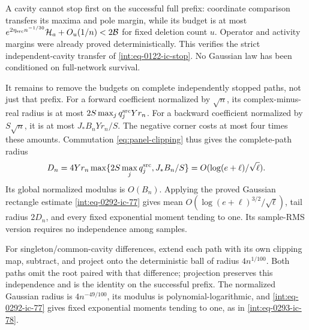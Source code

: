 A cavity cannot stop first on the successful full prefix: coordinate
comparison transfers its maxima and pole margin, while its budget is at
most \(e^{2\eta_{\rm src}n^{-1/30}}\mathcal H_a+O_u(1/n)
<2\mathcal B\) for fixed deletion count \(u\).  Operator and activity
margins were already proved deterministically.  This verifies the
strict independent-cavity transfer of \eqref{int:eq-0122-ic-stop}.
No Gaussian law has been conditioned on full-network survival.

It remains to remove the budgets on complete independently stopped
paths, not just that prefix.  For a forward coefficient normalized by
\(\sqrt n\), its complex-minus-real radius is at most
\(2S\max_jq_j^{\rm src}Yr_n\).  For a backward coefficient normalized
by \(S\sqrt n\), it is at most \(J_*B_nYr_n/S\).  The negative
corner costs at most four times these amounts.  Commutation
\eqref{eq:panel-clipping} thus gives the complete-path radius
\[
 D_n=4Yr_n\max\{2S\max_jq_j^{\rm src},J_*B_n/S\}
      =O(\log(e+\ell)/\sqrt\ell).
\]
Its global normalized modulus is \(O(B_n)\).  Applying the proved
Gaussian rectangle estimate \eqref{int:eq-0292-ic-77} gives mean
\(O(\log(e+\ell)^{3/2}/\sqrt\ell)\), tail radius \(2D_n\),
and every fixed exponential moment tending to one.  Its sample-RMS
version requires no independence among samples.

For singleton/common-cavity differences, extend each path with its own
clipping map, subtract, and project onto the deterministic ball of radius
\(4n^{1/100}\).  Both paths omit the root paired with that difference;
projection preserves this independence and is the identity on the
successful prefix.  The normalized Gaussian radius is
\(4n^{-49/100}\), its modulus is polynomial-logarithmic, and
\eqref{int:eq-0292-ic-77} gives fixed exponential moments tending to one,
as in \eqref{int:eq-0293-ic-78}.

